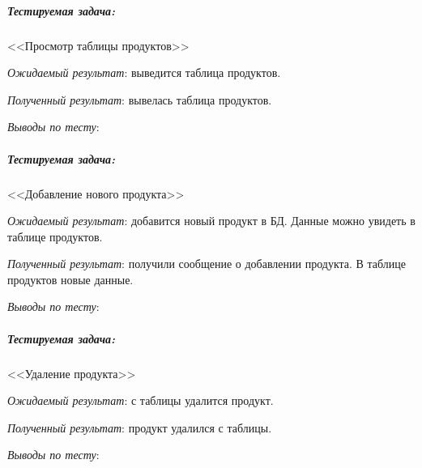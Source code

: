 
\subparagraph{Тестируемая задача:} <<Просмотр таблицы продуктов>>

\textit{Ожидаемый результат}: выведится таблица продуктов.

\textit{Полученный результат}: вывелась таблица продуктов.

\textit{Выводы по тесту}: 


\subparagraph{Тестируемая задача:} <<Добавление нового продукта>>

\textit{Ожидаемый результат}: добавится новый продукт в БД. Данные можно увидеть в таблице продуктов.

\textit{Полученный результат}: получили сообщение о добавлении продукта. В таблице продуктов новые данные.

\textit{Выводы по тесту}: 


\subparagraph{Тестируемая задача:} <<Удаление продукта>>

\textit{Ожидаемый результат}: с таблицы удалится продукт.

\textit{Полученный результат}: продукт удалился с таблицы.

\textit{Выводы по тесту}: 


\newpage

